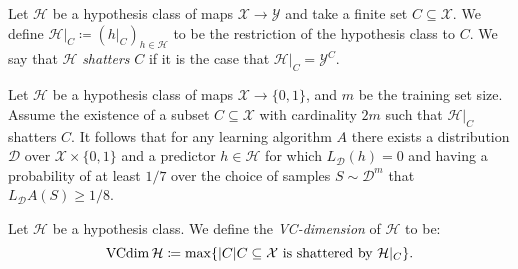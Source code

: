 \begin{definition}
\label{def:restrict-hypothesis-class}
Let \(\mathcal{H}\) be a hypothesis class of maps \(\mathcal{X} \to \mathcal{Y}\) and take a finite set
\(C \subseteq \mathcal{X}\). We define \(\mathcal{H}|_C \coloneq (h|_C)_{h \in \mathcal{H}}\) to be the restriction of the
hypothesis class to \(C\). We say that \(\mathcal{H}\) \emph{shatters} \(C\) if it is the
case that \(\mathcal{H}|_C = \mathcal{Y}^{C}\).
\end{definition}

\begin{corollary}
\label{cor:shatters-2m-cannot-learn-with-train-of-size-m}
Let \(\mathcal{H}\) be a hypothesis class of maps \(\mathcal{X} \to \{0, 1\}\), and \(m\) be the
training set size. Assume the existence of a subset \(C \subseteq \mathcal{X}\) with cardinality
\(2 m\) such that \(\mathcal{H}|_C\) shatters \(C\). It follows that for any learning
algorithm \(A\) there exists a distribution \(\mathcal{D}\) over \(\mathcal{X} \times \{0, 1\}\) and a
predictor \(h \in \mathcal{H}\) for which \(L_{\mathcal{D}}(h) = 0\) and having a probability of at
least \(1/7\) over the choice of samples \(S \sim \mathcal{D}^m\) that \(L_{\mathcal{D}}A(S) \geq 1/8\).
\end{corollary}

\begin{definition}[VC-dimension]
\label{def:vc-dimension}
Let \(\mathcal{H}\) be a hypothesis class. We define the \emph{VC-dimension} of
\(\mathcal{H}\) to be:
\[
\operatorname{VCdim} \mathcal{H} \coloneq \max \{|C| \relax C \subseteq \mathcal{X} \text{ is shattered by } \mathcal{H}|_C\}.
\]
\end{definition}

